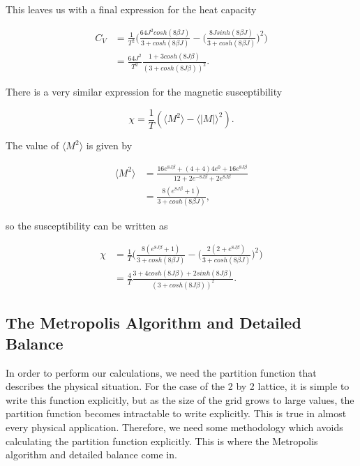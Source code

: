 \documentclass[%
oneside,                 %
final,                   %
10pt]{article}
\begin{document}
This leaves us with a final expression for the heat capacity

\begin{equation*}
\begin{split}
C_V & =\frac{1}{T^2} \Big( \frac{64 J^2 cosh(8 \beta J)}{3 + cosh(8 \beta J)}-  \Big(\frac{8 J sinh(8 \beta J)}{3 + cosh(8 \beta J)}\Big)^2 \Big) \\
&=\frac{64 J^2}{T^2}  \frac{1+3 cosh(8J \beta)}{(3 + cosh(8J \beta))^2}.
\end{split}
\end{equation*}

There is a very similar expression for the magnetic susceptibility 

\begin{equation*}
\chi=\frac{1}{T} (\langle M^2 \rangle - \langle |M| \rangle ^2).
\end{equation*}

The value of $\langle M^2 \rangle$ is given by

\begin{equation*}
\begin{split}
\langle M^2 \rangle & = \frac{16 e^{8 J \beta}+(4+4)4e^0 +16 e^{8 J \beta}}{12+2e^{-8 J \beta} + 2e^{8 J \beta}} \\
& = \frac{8(e^{8J\beta}+1)}{3 + cosh(8 \beta J)},
\end{split}
\end{equation*}

so the susceptibility can be written as 

\begin{equation*}
\begin{split}
\chi & =\frac{1}{T} \Big( \frac{8(e^{8J\beta}+1)}{3 + cosh(8 \beta J)} -  \Big(\frac{2(2+e^{8 J \beta})}{3 + cosh(8 \beta J)}\Big)^2 \Big) \\
&=\frac{4}{T}  \frac{3+4 cosh(8J \beta) + 2 sinh(8 J \beta)}{(3 + cosh(8J \beta))^2}.
\end{split}
\end{equation*}

\subsection{The Metropolis Algorithm and Detailed Balance}

In order to perform our calculations, we need the partition function that describes the physical situation.  For the case of the 2 by 2 lattice, it is simple to write this function explicitly, but as the size of the grid grows to large values, the partition function becomes intractable to write explicitly.  This is true in almost every physical application. Therefore, we need some methodology which avoids calculating the partition function explicitly.  This is where the Metropolis algorithm and detailed balance come in.
\end{document}
